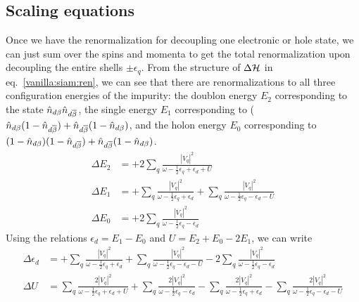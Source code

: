 \documentclass[12pt,twoside]{article}
\numberwithin{equation}{section}
\begin{document}
\subsection{Scaling equations}
Once we have the renormalization for decoupling one electronic or hole state, we can just sum over the spins and momenta to get the total renormalization upon decoupling the entire shells \(\pm \epsilon_q\). From the structure of \(\Delta \mathcal{H}\) in eq.~\ref{vanilla:siam:ren}, we can see that there are renormalizations to all three configuration energies of the impurity: the doublon energy \(E_2\) corresponding to the state  \(\hat n_{d\beta}\hat n_{d\overline\beta}\), the single energy \(E_1\) corresponding to (\(\hat n_{d\beta}(1 - \hat n_{d\overline\beta}) + \hat n_{d\overline\beta}(1 - \hat n_{d\beta})\), and the holon energy \(E_0\) corresponding to \((1 - \hat n_{d\beta})(1 - \hat n_{d\overline\beta}) + \hat n_{d\overline\beta}(1 - \hat n_{d\beta})\).
\begin{equation}\begin{aligned}
	\label{urg-siam}
	\Delta E_2 &= +2\sum_{q}\frac{|V_q|^2}{\omega - \frac{1}{2}\epsilon_q + \epsilon_d + U }\\
	\Delta E_1 &= +\sum_{q}\frac{|V_q|^2}{\omega - \frac{1}{2}\epsilon_q + \epsilon_d} + \sum_{q}\frac{|V_q|^2}{\omega - \frac{1}{2}\epsilon_q - \epsilon_d - U}\\
	\Delta E_0 &= +2\sum_{q}\frac{|V_q|^2}{\omega - \frac{1}{2}\epsilon_q - \epsilon_d}
\end{aligned}\end{equation}
Using the relations \(\epsilon_d = E_1 - E_0\) and \(U = E_2 + E_0 - 2E_1\), we can write
\begin{equation}\begin{aligned}
	\Delta \epsilon_d &= +\sum_{q}\frac{|V_q|^2}{\omega - \frac{1}{2}\epsilon_q + \epsilon_d} + \sum_{q}\frac{|V_q|^2}{\omega - \frac{1}{2}\epsilon_q - \epsilon_d - U} - 2\sum_{q}\frac{|V_q|^2}{\omega - \frac{1}{2}\epsilon_q - \epsilon_d}\\
	\Delta U &= \sum_{q}\frac{2|V_q|^2}{\omega - \frac{1}{2}\epsilon_q + \epsilon_d + U } + \sum_{q}\frac{2|V_q|^2}{\omega - \frac{1}{2}\epsilon_q - \epsilon_d} - \sum_{q}\frac{2|V_q|^2}{\omega - \frac{1}{2}\epsilon_q + \epsilon_d} - \sum_{q}\frac{2|V_q|^2}{\omega - \frac{1}{2}\epsilon_q - \epsilon_d - U}\\
\end{aligned}\end{equation}
\end{document}
